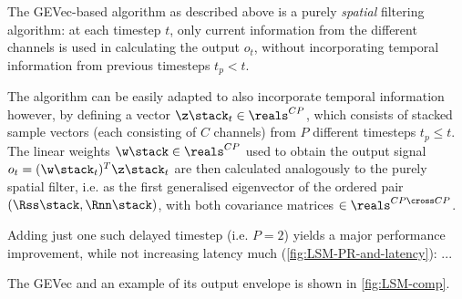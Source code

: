 \label{sec:spatiotemporal}

The GEVec-based algorithm as described above is a purely \emph{spatial} filtering algorithm: at each timestep $t$, only current information from the different channels is used in calculating the output $o_t$, without incorporating temporal information from previous timesteps $t_p < t$.

The algorithm can be easily adapted to also incorporate temporal information however, by defining a vector $\z\stack_t \in \reals^{CP}$, which consists of stacked sample vectors (each consisting of $C$ channels) from $P$ different timesteps $t_p \leq t$. The linear weights $\w\stack \in \reals^{CP}$ used to obtain the output signal $o_t = (\w\stack_t)^T \z\stack_t$ are then calculated analogously to the purely spatial filter, i.e. as the first generalised eigenvector of the ordered pair $(\Rss\stack, \Rnn\stack)$, with both covariance matrices $\in \reals^{CP \cross CP}$.

Adding just one such delayed timestep (i.e. $P = 2$) yields a major performance improvement, while not increasing latency much (\cref{fig:LSM-PR-and-latency}): ...

The GEVec and an example of its output envelope is shown in \cref{fig:LSM-comp}.
